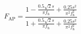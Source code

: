 \begin{equation}
F_{\mathrm{AP}} = \frac{1 - \frac{0.5 \sqrt{2} s}{\pi f_{\mathrm{h}}} + \frac{0.25 s^{2}}{\pi^{2} f_{\mathrm{h}}^{2}}}{1 + \frac{0.5 \sqrt{2} s}{\pi f_{\mathrm{h}}} + \frac{0.25 s^{2}}{\pi^{2} f_{\mathrm{h}}^{2}}}
\end{equation}

